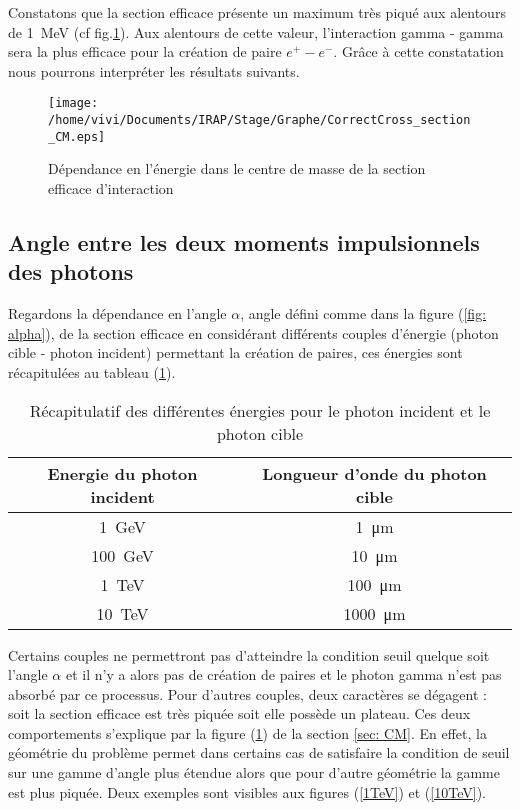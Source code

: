 \documentclass[a4paper,12pt,twoside]{article}
\begin{document}
Constatons que la section efficace présente un maximum très piqué aux alentours de \SI{1}{\MeV} (cf fig.\ref{sigma CM}). Aux alentours de cette valeur, l'interaction gamma - gamma sera la plus efficace pour la création de paire $e^+ - e^-$. Grâce à cette constatation nous pourrons interpréter les résultats suivants.


\begin{figure}[H]
	\centering
    \texttt{[image: /home/vivi/Documents/IRAP/Stage/Graphe/CorrectCross\_section\_CM.eps]}
    \caption{Dépendance en l'énergie dans le centre de masse de la section efficace d'interaction}
    \label{sigma CM}
\end{figure}

\subsection{Angle entre les deux moments impulsionnels des photons}

Regardons la dépendance en l'angle $\alpha$, angle défini comme dans la figure (\ref{fig: alpha}), de la section efficace en considérant différents couples d'énergie (photon cible - photon incident) permettant la création de paires, ces énergies sont récapitulées au tableau (\ref{tab: energies}).

\begin{table}[H]
	\centering
    \begin{tabular}{|c|c|}
    	\hline
      		Energie du photon incident & Longueur d'onde du photon cible\\
		\hline
       		\SI{1}{\GeV} & \SI{1}{\micro\m}\\
            \SI{100}{\GeV} & \SI{10}{\micro\m}\\
            \SI{1}{\TeV} & \SI{100}{\micro\m}\\
        	\SI{10}{\TeV} & \SI{1000}{\micro\m}\\
         \hline
    \end{tabular}
    \caption{Récapitulatif des différentes énergies pour le photon incident et le photon cible}
    \label{tab: energies}
\end{table}
Certains couples ne permettront pas d'atteindre la condition seuil quelque soit l'angle $\alpha$ et il n'y a alors pas de création de paires et le photon gamma n'est pas absorbé par ce processus. Pour d'autres couples, deux caractères se dégagent : soit la section efficace est très piquée soit elle possède un plateau. Ces deux comportements s'explique par la figure (\ref{sigma CM}) de la section \ref{sec: CM}. En effet, la géométrie du problème permet dans certains cas de satisfaire la condition de seuil sur une gamme d'angle plus étendue alors que pour d'autre géométrie la gamme est plus piquée. Deux exemples sont visibles aux figures (\ref{1TeV}) et (\ref{10TeV}).
\end{document}
